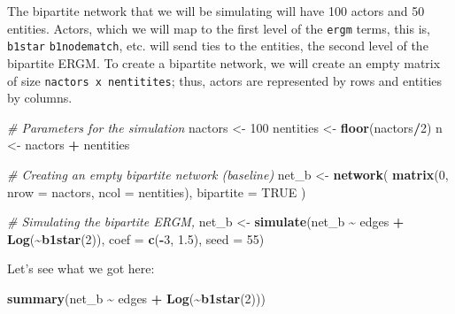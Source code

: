 \documentclass[
]{book}
\newenvironment{Shaded}{\begin{snugshade}}{\end{snugshade}}
\newcommand{\AttributeTok}[1]{\textcolor[rgb]{0.13,0.29,0.53}{#1}}
\newcommand{\CommentTok}[1]{\textcolor[rgb]{0.56,0.35,0.01}{\textit{#1}}}
\newcommand{\ConstantTok}[1]{\textcolor[rgb]{0.56,0.35,0.01}{#1}}
\newcommand{\DecValTok}[1]{\textcolor[rgb]{0.00,0.00,0.81}{#1}}
\newcommand{\FloatTok}[1]{\textcolor[rgb]{0.00,0.00,0.81}{#1}}
\newcommand{\FunctionTok}[1]{\textcolor[rgb]{0.13,0.29,0.53}{\textbf{#1}}}
\newcommand{\NormalTok}[1]{#1}
\newcommand{\OtherTok}[1]{\textcolor[rgb]{0.56,0.35,0.01}{#1}}
\newcommand{\SpecialCharTok}[1]{\textcolor[rgb]{0.81,0.36,0.00}{\textbf{#1}}}
\begin{document}
The bipartite network that we will be simulating will have 100 actors and 50 entities. Actors, which we will map to the first level of the \texttt{ergm} terms, this is, \texttt{b1star} \texttt{b1nodematch}, etc. will send ties to the entities, the second level of the bipartite ERGM. To create a bipartite network, we will create an empty matrix of size \texttt{nactors\ x\ nentitites}; thus, actors are represented by rows and entities by columns.

\begin{Shaded}
\begin{Highlighting}[]
\CommentTok{\# Parameters for the simulation}
\NormalTok{nactors   }\OtherTok{\textless{}{-}} \DecValTok{100}
\NormalTok{nentities }\OtherTok{\textless{}{-}} \FunctionTok{floor}\NormalTok{(nactors}\SpecialCharTok{/}\DecValTok{2}\NormalTok{)}
\NormalTok{n         }\OtherTok{\textless{}{-}}\NormalTok{ nactors }\SpecialCharTok{+}\NormalTok{ nentities}

\CommentTok{\# Creating an empty bipartite network (baseline)}
\NormalTok{net\_b }\OtherTok{\textless{}{-}} \FunctionTok{network}\NormalTok{(}
  \FunctionTok{matrix}\NormalTok{(}\DecValTok{0}\NormalTok{, }\AttributeTok{nrow =}\NormalTok{ nactors, }\AttributeTok{ncol =}\NormalTok{ nentities), }\AttributeTok{bipartite =} \ConstantTok{TRUE}
\NormalTok{)}

\CommentTok{\# Simulating the bipartite ERGM,}
\NormalTok{net\_b }\OtherTok{\textless{}{-}} \FunctionTok{simulate}\NormalTok{(net\_b }\SpecialCharTok{\textasciitilde{}}\NormalTok{ edges }\SpecialCharTok{+} \FunctionTok{Log}\NormalTok{(}\SpecialCharTok{\textasciitilde{}}\FunctionTok{b1star}\NormalTok{(}\DecValTok{2}\NormalTok{)), }\AttributeTok{coef =} \FunctionTok{c}\NormalTok{(}\SpecialCharTok{{-}}\DecValTok{3}\NormalTok{, }\FloatTok{1.5}\NormalTok{), }\AttributeTok{seed =} \DecValTok{55}\NormalTok{)}
\end{Highlighting}
\end{Shaded}

Let's see what we got here:

\begin{Shaded}
\begin{Highlighting}[]
\FunctionTok{summary}\NormalTok{(net\_b }\SpecialCharTok{\textasciitilde{}}\NormalTok{ edges }\SpecialCharTok{+} \FunctionTok{Log}\NormalTok{(}\SpecialCharTok{\textasciitilde{}}\FunctionTok{b1star}\NormalTok{(}\DecValTok{2}\NormalTok{)))}
\end{Highlighting}
\end{Shaded}
\end{document}
